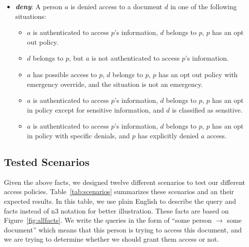 \documentclass[conference]{IEEEtran}
\begin{document}
\begin{itemize}
\item \textbf{\textit{deny}}: A person $a$ is denied access to a document $d$ in one of the following situations:
\begin{itemize}
 \item $a$ is authenticated to access $p$'s information, $d$ belongs to $p$, $p$ has an opt out policy.
\item $d$ belongs to $p$, but $a$ is not authenticated to access $p$'s information.
\item $a$ has possible access to $p$, $d$ belongs to $p$, $p$ has an opt out policy with emergency override, and the situation is not an emergency.
\item $a$ is authenticated to access $p$'s information, $d$ belongs to $p$, $p$ has an opt in policy except for sensitive information, and $d$ is classified as
sensitive.
\item $a$ is authenticated to access $p$'s information, $d$ belongs to $p$, $p$ has an opt in policy with specific denials, and $p$ has explicitly denied $a$
access.
\end{itemize}

\end{itemize}


\subsection{Tested Scenarios}

Given the above facts, we designed twelve different scenarios to test our different access policies. Table~\ref{tab:scenarios} summarizes these scenarios and
an their expected results. In this table, we use plain English to describe the query and facts instead of n3 notation for better illustration. These facts are
based on Figure~\ref{fig:allfacts}. We write the queries in the form of ``some person $\rightarrow$ some document'' which means that this person is trying to
access this document, and we are trying to determine whether we should grant them access or not.
\end{document}
